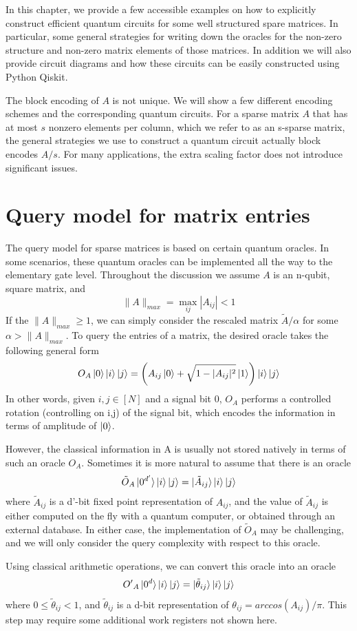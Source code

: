 \documentclass[12pt, oneside]{book}
\theoremstyle{definition}
\theoremstyle{definition}
\theoremstyle{remark}
\begin{document}
In this chapter, we provide a few accessible examples on how to explicitly construct efficient quantum circuits for some well structured spare matrices. In particular, some general strategies for writing down the oracles for the non-zero structure and non-zero matrix elements of those matrices. In addition we will also provide circuit diagrams and how these circuits can be easily constructed using Python Qiskit. 

The block encoding of $A$ is not unique. We will show a few different encoding schemes and the corresponding quantum circuits. For a sparse matrix $A$ that has at most $s$ nonzero elements per column, which we refer to as an s-sparse matrix, the general strategies we use to construct a quantum circuit actually block encodes $A/s$. For many applications, the extra scaling factor does not introduce significant issues. 
\section{Query model for matrix entries}
The query model for sparse matrices is based on certain quantum oracles. In some scenarios, these quantum oracles can be implemented all the way to the elementary gate level. Throughout the discussion we assume $A$ is an n-qubit, square matrix, and 
\[
\|A\|_{max}=\max_{ij}|A_{ij}|<1
\]
If the $\|A\|_{max}\geq 1$, we can simply consider the rescaled matrix $\tilde{A}/\alpha$ for some $\alpha>\|A\|_{max}$. To query the entries of a matrix, the desired oracle takes the following general form
\[
O_A\ket{0}\ket{i}\ket{j}=\left(A_{ij}\ket{0}+\sqrt{1-|A_{ij}|^2}\ket{1}\right)\ket{i}\ket{j}
\]
In other words, given $i,j\in[N]$ and a signal bit $0$, $O_A$ performs a controlled rotation (controlling on i,j) of the signal bit, which encodes the information in terms of amplitude of $\ket{0}$.

However, the classical information in A is usually not stored natively in terms of such an oracle $O_A$. Sometimes it is more natural to assume that there is an oracle
\[
\tilde{O}_A\ket{0^{d'}}\ket{i}\ket{j}=\ket{\tilde{A}_{ij}}\ket{i}\ket{j}
\]
where $\tilde{A}_{ij}$ is a d'-bit fixed point representation of $A_{ij}$, and the value of $\tilde{A}_{ij}$ is either computed on the fly with a quantum computer, or obtained through an external database. In either case, the implementation of $\tilde{O}_A$ may be challenging, and we will only consider the query complexity with respect to this oracle.

Using classical arithmetic operations, we can convert this oracle into an oracle
\[
{O'}_A\ket{0^d}\ket{i}\ket{j}=\ket{\tilde{\theta}_{ij}}\ket{i}\ket{j}
\]
where $0\leq \tilde{\theta}_{ij}<1$, and $\tilde{\theta}_{ij}$ is a d-bit representation of $\theta_{ij}=arccos(A_{ij})/\pi$. This step may require some additional work registers not shown here.
\end{document}
